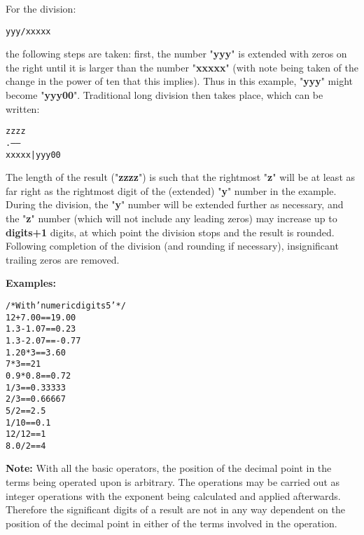 \begin{description}
For the division:
\begin{alltt}
yyy / xxxxx
\end{alltt}
the following steps are taken: first, the number
"\textbf{yyy}" is extended
with zeros on the right until it is larger than
the number "\textbf{xxxxx}" (with note being taken of the change
in the power of ten that this implies).  Thus in this example,
"\textbf{yyy}"
might become
"\textbf{yyy00}".
Traditional long division then takes place, which can be written:
\begin{alltt}
         zzzz
      .------
xxxxx | yyy00
\end{alltt}

The length of the result ("\textbf{zzzz}") is such that the
rightmost "\textbf{z}" will be at least as far right as the
rightmost digit of the (extended) "\textbf{y}" number in the
example.  During the division, the "\textbf{y}" number will be
extended further as necessary, and the "\textbf{z}" number
(which will not include any leading zeros) may increase up
to \textbf{digits+1} digits, at which point the division stops and the
result is rounded.
Following completion of the division (and rounding if necessary),
insignificant trailing zeros are removed.
\end{description}
 \textbf{Examples:}
\begin{alltt}
/* With 'numeric digits 5' */
12+7.00     ==  19.00
1.3-1.07    ==  0.23
1.3-2.07    ==  -0.77
1.20*3      ==  3.60
7*3         ==  21
0.9*0.8     ==  0.72
1/3         ==  0.33333
2/3         ==  0.66667
5/2         ==  2.5
1/10        ==  0.1
12/12       ==  1
8.0/2       ==  4
\end{alltt}
\textbf{Note: }With all the basic operators, the position of the decimal point
in the terms being operated upon is arbitrary.
The operations may be carried out as integer operations with the
exponent being calculated and applied afterwards.
Therefore the significant digits of a result are not in any way
dependent on the position of the decimal point in either of the terms
involved in the operation.
